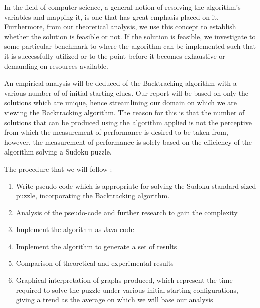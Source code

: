\documentclass[12pt]{article}
\begin{document}
\begin{flushleft}
In the field of computer science, a general notion of resolving the algorithm's variables and mapping it, is one that has great emphasis placed on it. Furthermore, from our theoretical analysis, we use this concept to establish whether the solution is feasible or not. If the solution is feasible, we investigate to some particular benchmark to where the algorithm can be implemented such that it is successfully utilized or to the point before it becomes exhaustive or demanding on resources available. 
\end{flushleft}

\begin{flushleft}
An empirical analysis will be deduced of the Backtracking algorithm with a various number of of initial starting clues. Our report will be based on only the solutions which are unique, hence streamlining our domain on which we are viewing the Backtracking algorithm. The reason for this is that the number of solutions that can be produced using the algorithm applied is not the perceptive from which the measurement of performance is desired to be taken from, however, the measurement of performance is solely based on the efficiency of the algorithm solving a Sudoku puzzle. 
\end{flushleft}

\begin{flushleft}
The procedure that we will follow : 
\begin{enumerate}
\item Write pseudo-code which is appropriate for solving the Sudoku standard sized puzzle, incorporating the Backtracking algorithm.
\item Analysis of the pseudo-code and further research to gain the complexity
\item Implement the algorithm as Java code 
\item Implement the algorithm to generate a set of results
\item Comparison of theoretical and experimental results
\item Graphical interpretation of graphs produced, which represent the time required to solve the puzzle under various initial starting configurations, giving a trend as the average on which we will base our analysis 
\end{enumerate}
\end{flushleft}
\end{document}
